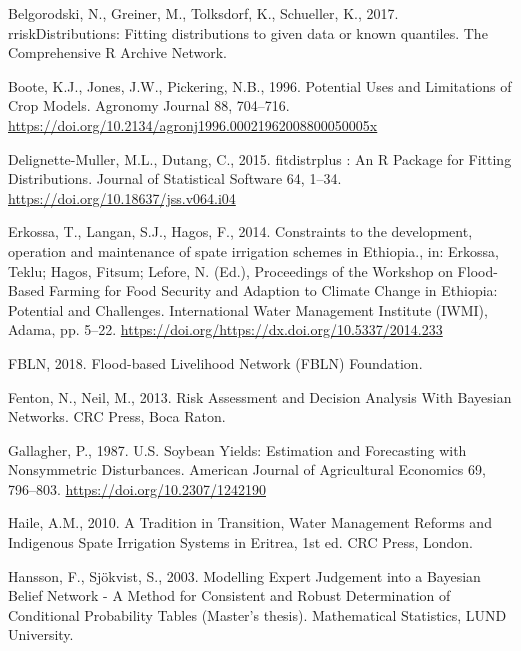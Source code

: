 \documentclass[]{elsarticle} %
\begin{document}
\leavevmode\hypertarget{ref-Belgorodski_et_al_2017}{}%
Belgorodski, N., Greiner, M., Tolksdorf, K., Schueller, K., 2017. rriskDistributions: Fitting distributions to given data or known quantiles. The Comprehensive R Archive Network.

\leavevmode\hypertarget{ref-Boote_et_al_1996}{}%
Boote, K.J., Jones, J.W., Pickering, N.B., 1996. Potential Uses and Limitations of Crop Models. Agronomy Journal 88, 704--716. \url{https://doi.org/10.2134/agronj1996.00021962008800050005x}

\leavevmode\hypertarget{ref-Delignette-Muller_and_Dutang_2015}{}%
Delignette-Muller, M.L., Dutang, C., 2015. fitdistrplus : An R Package for Fitting Distributions. Journal of Statistical Software 64, 1--34. \url{https://doi.org/10.18637/jss.v064.i04}

\leavevmode\hypertarget{ref-Erkossa_et_al_2014}{}%
Erkossa, T., Langan, S.J., Hagos, F., 2014. Constraints to the development, operation and maintenance of spate irrigation schemes in Ethiopia., in: Erkossa, Teklu; Hagos, Fitsum; Lefore, N. (Ed.), Proceedings of the Workshop on Flood-Based Farming for Food Security and Adaption to Climate Change in Ethiopia: Potential and Challenges. International Water Management Institute (IWMI), Adama, pp. 5--22. \url{https://doi.org/https://dx.doi.org/10.5337/2014.233}

\leavevmode\hypertarget{ref-FBLN_2018}{}%
FBLN, 2018. Flood-based Livelihood Network (FBLN) Foundation.

\leavevmode\hypertarget{ref-Fenton_and_Neil_2013}{}%
Fenton, N., Neil, M., 2013. Risk Assessment and Decision Analysis With Bayesian Networks. CRC Press, Boca Raton.

\leavevmode\hypertarget{ref-Gallagher_1987}{}%
Gallagher, P., 1987. U.S. Soybean Yields: Estimation and Forecasting with Nonsymmetric Disturbances. American Journal of Agricultural Economics 69, 796--803. \url{https://doi.org/10.2307/1242190}

\leavevmode\hypertarget{ref-Haile_2010}{}%
Haile, A.M., 2010. A Tradition in Transition, Water Management Reforms and Indigenous Spate Irrigation Systems in Eritrea, 1st ed. CRC Press, London.

\leavevmode\hypertarget{ref-Hansson_and_Sjokvist_2013}{}%
Hansson, F., Sjökvist, S., 2003. Modelling Expert Judgement into a Bayesian Belief Network - A Method for Consistent and Robust Determination of Conditional Probability Tables (Master's thesis). Mathematical Statistics, LUND University.
\end{document}
